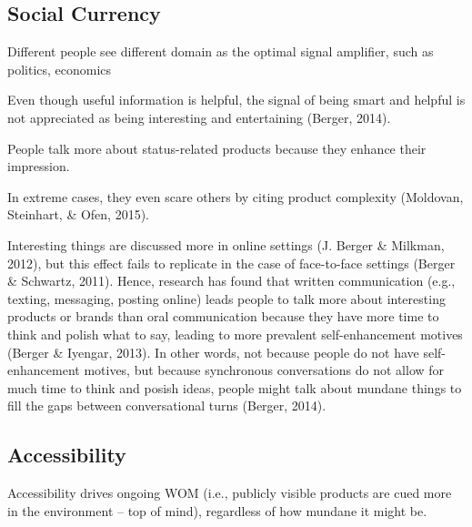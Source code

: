 \documentclass[
]{book}
\begin{document}
\hypertarget{social-currency}{%
\subsection{Social Currency}\label{social-currency}}

Different people see different domain as the optimal signal amplifier, such as politics, economics

Even though useful information is helpful, the signal of being smart and helpful is not appreciated as being interesting and entertaining (Berger, 2014).

People talk more about status-related products because they enhance their impression.

In extreme cases, they even scare others by citing product complexity (Moldovan, Steinhart, \& Ofen, 2015).

Interesting things are discussed more in online settings (J. Berger \& Milkman, 2012), but this effect fails to replicate in the case of face-to-face settings (Berger \& Schwartz, 2011). Hence, research has found that written communication (e.g., texting, messaging, posting online) leads people to talk more about interesting products or brands than oral communication because they have more time to think and polish what to say, leading to more prevalent self-enhancement motives (Berger \& Iyengar, 2013). In other words, not because people do not have self-enhancement motives, but because synchronous conversations do not allow for much time to think and posish ideas, people might talk about mundane things to fill the gaps between conversational turns (Berger, 2014).

\hypertarget{accessibility}{%
\subsection{Accessibility}\label{accessibility}}

Accessibility drives ongoing WOM (i.e., publicly visible products are cued more in the environment -- top of mind), regardless of how mundane it might be.
\end{document}
